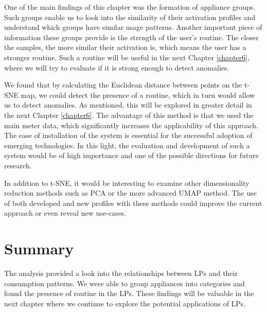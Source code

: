 One of the main findings of this chapter was the formation of appliance groups.
Such groups enable us to look into the similarity of their activation profiles and understand which groups have similar usage patterns.
Another important piece of information these groups provide is the strength of the user's routine.
The closer the samples, the more similar their activation is, which means the user has a stronger routine.
Such a routine will be useful in the next Chapter \ref{chapter6}, where we will try to evaluate if it is strong enough to detect anomalies.

We found that by calculating the Euclidean distance between points on the t-SNE map, we could detect the presence of a routine, which in turn would allow us to detect anomalies.
As mentioned, this will be explored in greater detail in the next Chapter \ref{chapter6}.
The advantage of this method is that we used the main meter data, which significantly increases the applicability of this approach.
The ease of installation of the system is essential for the successful adoption of emerging technologies.
In this light, the evaluation and development of such a system would be of high importance and one of the possible directions for future research.

In addition to t-SNE, it would be interesting to examine other dimensionality reduction methods such as PCA or the more advanced UMAP method.
The use of both developed and new profiles with these methods could improve the current approach or even reveal new use-cases.

\section{Summary}

The analysis provided a look into the relationships between LPs and their consumption patterns.
We were able to group appliances into categories and found the presence of routine in the LPs.
These findings will be valuable in the next chapter where we continue to explore the potential applications of LPs.